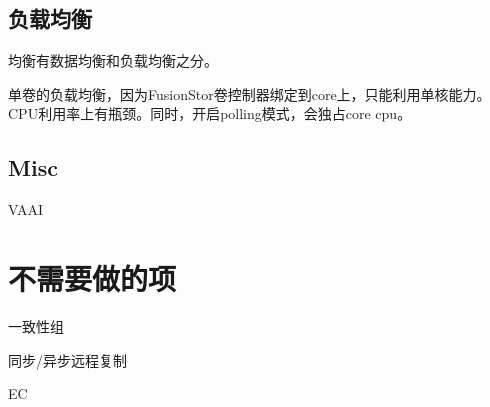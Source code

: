 \subsection{负载均衡}

均衡有数据均衡和负载均衡之分。

单卷的负载均衡，因为FusionStor卷控制器绑定到core上，只能利用单核能力。
CPU利用率上有瓶颈。同时，开启polling模式，会独占core cpu。

\subsection{Misc}

VAAI

\section{不需要做的项}

\begin{enumbox}
    \item 一致性组
    \item 同步/异步远程复制
    \item EC
\end{enumbox}
